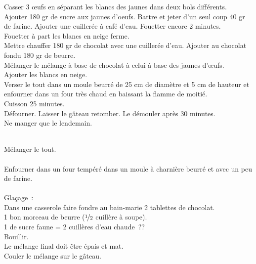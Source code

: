 \begin{minipage}[c]{\textwidth}
Casser 3 œufs en séparant les blancs des jaunes dans deux bols différents.\\
Ajouter 180 gr de sucre aux jaunes d'oeufs. Battre et jeter d’un seul coup 40 gr de farine. Ajouter une cuillerée à café d’eau. Fouetter encore 2 minutes.\\
Fouetter à part les blancs en neige ferme.\\
Mettre chauffer 180 gr de chocolat avec une cuillerée d’eau. Ajouter au chocolat fondu 180 gr de beurre.\\
Mélanger le mélange à base de chocolat à celui à base des jaunes d’œufs. \\
Ajouter les blancs en neige. \\
Verser le tout dans un moule beurré de 25 cm de diamètre et 5 cm de hauteur et enfourner dans un four très chaud en baissant la flamme de moitié.\\
Cuisson 25 minutes.\\
Défourner. Laisser le gâteau retomber. Le démouler après 30 minutes.\\
Ne manger que le lendemain. \\
\\

\end{minipage}

\begin{minipage}[c]{\textwidth}
Mélanger le tout.\\
\\
Enfourner dans un four tempéré dans un moule à charnière beurré et avec un peu de farine.\\
\\
Glaçage :\\
Dans une casserole faire fondre au bain-marie 2 tablettes de chocolat. \\
1 bon morceau de beurre ($\nicefrac{1}{2}$ cuillère à soupe).\\
1 de sucre faune = 2 cuillères d’eau chaude ??\\
Bouillir.\\
Le mélange final doit être épais et mat.\\
Couler le mélange sur le gâteau.\\
\\

\end{minipage}

